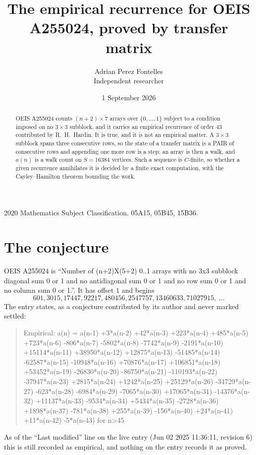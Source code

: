 \documentclass[11pt,a4paper]{article}
\title{The empirical recurrence for OEIS A255024, proved by transfer matrix}
\author{Adrian Perez Fontelles\\ \small Independent researcher}
\date{1 September 2026}
\theoremstyle{plain}
\theoremstyle{definition}
\begin{document}
\maketitle

\begin{abstract}
OEIS A255024 counts $(n+2)\times7$ arrays over $\{0,\dots,1\}$ subject to a condition imposed on
no $3\times3$ subblock, and it carries an empirical recurrence of order $43$
contributed by R.~H.~Hardin. It is true, and it is not an empirical matter. A $3\times3$
subblock spans three consecutive rows, so the state of a transfer matrix is a PAIR of
consecutive rows and appending one more row is a step; an array is then a walk, and
$a(n)$ is a walk count on $S=16384$ vertices. Such a sequence is $C$-finite, so whether a given
recurrence annihilates it is decided by a finite exact computation, with the Cayley--Hamilton
theorem bounding the work.
\end{abstract}

\noindent\small 2020 Mathematics Subject Classification. 05A15, 05B45, 15B36.\normalsize

\section{The conjecture}

OEIS A255024 is ``Number of (n+2)X(5+2) 0..1 arrays with no 3x3 subblock diagonal sum 0 or 1 and no antidiagonal sum 0 or 1 and no row sum 0 or 1 and no column sum 0 or 1.''. It has offset $1$ and begins
\[
601, 3015, 17447, 92217, 480456, 2547757, 13460633, 71027915,\ \dots
\]
The entry states, as a conjecture contributed by its author and never marked settled:
\begin{quote}
Empirical: a(n) = a(n-1) +3*a(n-2) +42*a(n-3) +223*a(n-4) +485*a(n-5) +723*a(n-6) -806*a(n-7) -5802*a(n-8) -7742*a(n-9) -2191*a(n-10) +15114*a(n-11) +38950*a(n-12) +12875*a(n-13) -51485*a(n-14) -62587*a(n-15) -10948*a(n-16) +70876*a(n-17) +106851*a(n-18) +53452*a(n-19) -26830*a(n-20) -86750*a(n-21) -110193*a(n-22) -37947*a(n-23) +2815*a(n-24) +1242*a(n-25) +25129*a(n-26) -34729*a(n-27) -623*a(n-28) -6984*a(n-29) -7065*a(n-30) +17065*a(n-31) -14376*a(n-32) +11137*a(n-33) -9534*a(n-34) +5434*a(n-35) -2728*a(n-36) +1898*a(n-37) -781*a(n-38) +255*a(n-39) -156*a(n-40) +24*a(n-41) +11*a(n-42) -5*a(n-43) for n>45
\end{quote}
As of the ``Last modified'' line on the live entry (Jun 02 2025 11:36:11, revision 6) this is still
recorded as empirical, and nothing on the entry records it as proved.
\end{document}
